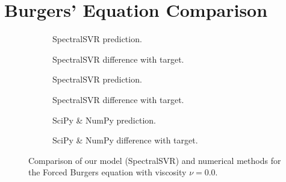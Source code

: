 \section{Burgers' Equation Comparison}\label{sec:burgers_comparison}
\begin{figure}[H]
  \centering
  \begin{adjustwidth}{-0.05\linewidth}{-0.05\linewidth}
    \begin{subfigure}{0.49\linewidth}
      \begin{adjustbox}{width=\linewidth}
        
      \end{adjustbox}
      \caption{SpectralSVR prediction.}\label{fig:comp_lssvr_pred_0.0}
    \end{subfigure}
    \begin{subfigure}{0.49\linewidth}
      \begin{adjustbox}{width=\linewidth}
        
      \end{adjustbox}
      \caption{SpectralSVR difference with target.}\label{fig:comp_lssvr_diff_0.0}
    \end{subfigure}
    \begin{subfigure}{0.49\linewidth}
      \begin{adjustbox}{width=\linewidth}
        
      \end{adjustbox}
      \caption{SpectralSVR prediction.}\label{fig:comp_fnn_pred_0.0}
    \end{subfigure}
    \begin{subfigure}{0.49\linewidth}
      \begin{adjustbox}{width=\linewidth}
        
      \end{adjustbox}
      \caption{SpectralSVR difference with target.}\label{fig:comp_fnn_diff_0.0}
    \end{subfigure}
    \begin{subfigure}{0.49\linewidth}
      \begin{adjustbox}{width=\linewidth}
        
      \end{adjustbox}
      \caption{SciPy \& NumPy prediction.}\label{fig:comp_spo_pred_0.0}
    \end{subfigure}
    \begin{subfigure}{0.49\linewidth}
      \begin{adjustbox}{width=\linewidth}
        
      \end{adjustbox}
      \caption{SciPy \& NumPy difference with target.}\label{fig:comp_spo_diff_0.0}
    \end{subfigure}
  \end{adjustwidth}
  \caption{Comparison of our model (SpectralSVR) and numerical methods for the Forced Burgers equation with viscosity \(\nu=0.0\).}\label{fig:comparison_burgers_0.0}
\end{figure}

